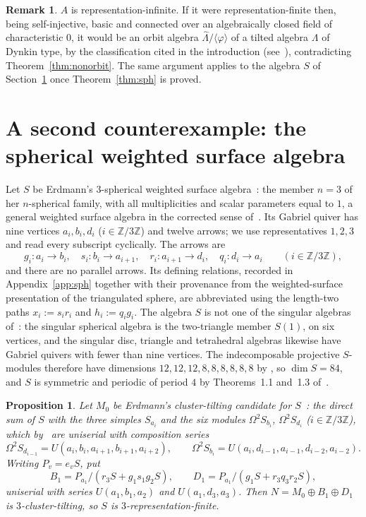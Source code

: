 \documentclass[11pt]{amsart}
\theoremstyle{plain}
\newtheorem{proposition}[theorem]{Proposition}
\theoremstyle{definition}
\newtheorem{remark}[theorem]{Remark}
\newcommand{\rep}{\widehat{\Lambda}}
\newcommand{\ZZ}{\mathbb{Z}}
\begin{document}
\begin{remark}\label{rem:repinf}
$A$ is representation-infinite. If it were representation-finite then, being self-injective, basic and
connected over an algebraically closed field of characteristic $0$, it would be an orbit algebra
$\rep/\langle\varphi\rangle$ of a tilted algebra $\Lambda$ of Dynkin type, by the classification cited in the
introduction (see~\cite[Theorem~1.1]{DI}), contradicting Theorem~\ref{thm:nonorbit}. The same argument applies
to the algebra $S$ of Section~\ref{sec:sph} once Theorem~\ref{thm:sph} is proved.
\end{remark}

\section{A second counterexample: the spherical weighted surface algebra}\label{sec:sph}

Let $S$ be Erdmann's $3$-spherical weighted surface algebra~\cite[\S3.4]{Erdmann}: the member $n=3$ of her
$n$-spherical family, with all multiplicities and scalar parameters equal to $1$, a general weighted surface
algebra in the corrected sense of~\cite{ErdmannSkowronskiGV,ErdmannSkowronskiCorr}. Its Gabriel quiver has
nine vertices $a_i,b_i,d_i$ ($i\in\ZZ/3\ZZ$) and twelve arrows; we use representatives $1,2,3$ and read every
subscript cyclically. The arrows are
\[
  g_i\colon a_i\to b_i,\quad s_i\colon b_i\to a_{i+1},\quad r_i\colon a_{i+1}\to d_i,\quad q_i\colon d_i\to a_i
  \qquad(i\in\ZZ/3\ZZ),
\]
and there are no parallel arrows. Its defining relations, recorded in Appendix~\ref{app:sph} together with
their provenance from the weighted-surface presentation of the triangulated sphere, are abbreviated using the
length-two paths $x_i:=s_ir_i$ and $h_i:=q_ig_i$. The algebra $S$ is not one of the singular algebras
of~\cite{ErdmannSkowronskiGV}: the singular spherical algebra is the two-triangle member $S(1)$, on six
vertices, and the singular disc, triangle and tetrahedral algebras likewise have Gabriel quivers with fewer
than nine vertices. The indecomposable projective $S$-modules therefore have dimensions $12,12,12,8,8,8,8,8,8$
by \cite[Corollary~4.12]{ErdmannSkowronskiGV}, so $\dim S=84$, and $S$ is symmetric and periodic of period $4$
by Theorems~1.1 and~1.3 of~\cite{ErdmannSkowronskiGV}.

\begin{proposition}\label{prop:sph-rf}
Let $M_0$ be Erdmann's cluster-tilting candidate for $S$~\cite[Definition~4.1]{Erdmann}: the direct sum of $S$
with the three simples $S_{a_i}$ and the six modules $\Omega^2S_{b_i}$, $\Omega^2S_{d_i}$ ($i\in\ZZ/3\ZZ$),
which by~\cite[Lemma~4.2]{Erdmann} are uniserial with composition series
\[
  \Omega^2S_{d_{i-1}}=U(a_i,b_i,a_{i+1},b_{i+1},a_{i+2}),\qquad
  \Omega^2S_{b_i}=U(a_i,d_{i-1},a_{i-1},d_{i-2},a_{i-2}).
\]
Writing $P_v=e_vS$, put
\[
 B_1=P_{a_1}/(r_3S+g_1s_1g_2S),\qquad D_1=P_{a_1}/(g_1S+r_3q_3r_2S),
\]
uniserial with series $U(a_1,b_1,a_2)$ and $U(a_1,d_3,a_3)$. Then $N=M_0\oplus B_1\oplus D_1$ is
$3$-cluster-tilting, so $S$ is $3$-representation-finite.
\end{proposition}
\end{document}
